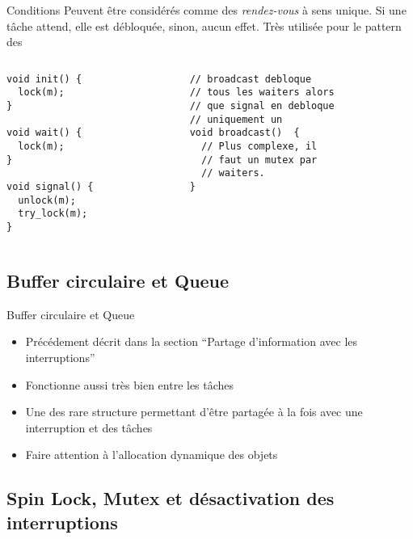 \begin{frame}[fragile]{Conditions}
  Peuvent  être   considérés  comme  des   \emph{rendez-vous}  à  sens
  unique. Si une tâche attend, elle est débloquée, sinon, aucun effet.
  Très utilisée pour le pattern des 
  \begin{columns}
    \begin{column}{5cm}
      \begin{lstlisting} 
void init() {
  lock(m);
}

void wait() {
  lock(m);
}

void signal() {
  unlock(m);
  try_lock(m);
}
      \end{lstlisting}
    \end{column}
    \begin{column}{5.5cm}
      \begin{lstlisting} 
// broadcast debloque
// tous les waiters alors
// que signal en debloque
// uniquement un
void broadcast()  {
  // Plus complexe, il
  // faut un mutex par
  // waiters. 
}
      \end{lstlisting} 
    \end{column}
  \end{columns}
\end{frame} 

\subsection{Buffer circulaire et Queue}

\begin{frame}[fragile]{Buffer circulaire et Queue}
  \begin{itemize} 
  \item  Précédement décrit dans  la section  ``Partage d'information
    avec les interruptions''
  \item Fonctionne aussi très bien entre les tâches
  \item Une  des rare structure  permettant d'être partagée à  la fois
    avec une interruption et des tâches
  \item Faire attention à l'allocation dynamique des objets
  \end{itemize}
\end{frame} 

\subsection{Spin Lock, Mutex et désactivation des interruptions}

